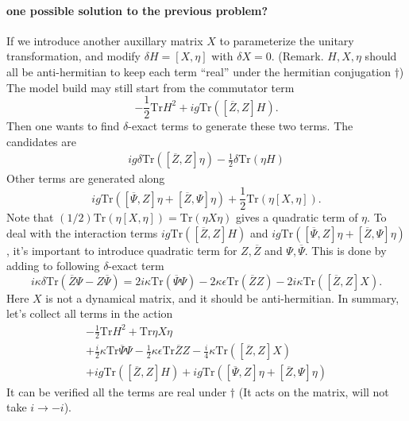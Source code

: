 \paragraph{one possible solution to the previous problem?}
If we introduce another auxillary matrix $X$ to parameterize the unitary transformation,
and modify $\delta H = [X,\eta]$ with $\delta X = 0$. (Remark. $H,X,\eta$ should all be anti-hermitian to keep each term ``real'' under the hermitian conjugation $\dagger$)
The model build may still start from the commutator term
\[
	- \frac{1}{2} \mathrm{Tr}H^2 + ig \mathrm{Tr}\left([\overline{Z},Z]H\right)
.\] 
Then one wants to find $\delta$-exact terms to generate these two terms.
The candidates are
\begin{align*}
	i g \delta \mathrm{Tr}\left([\overline{Z},Z]\eta\right) - \frac{1}{2} \delta \mathrm{Tr}\left(\eta H\right)
\end{align*}
Other terms are generated along
\[
	i g \mathrm{Tr}\left([\overline{\Psi},Z]\eta + [\overline{Z},\Psi]\eta\right) + \frac{1}{2} \mathrm{Tr}\left(\eta [X,\eta]\right)
.\] 
Note that $(1 / 2)\mathrm{Tr}(\eta [X, \eta]) = \mathrm{Tr} (\eta X \eta)$ gives a quadratic term of $\eta$.
To deal with the interaction terms $ig\mathrm{Tr}([\overline{Z},Z]H)$ and 
$ig \mathrm{Tr}([\overline{\Psi},Z]\eta + [\overline{Z},\Psi]\eta)$,
it's important to introduce quadratic term for $Z,\overline{Z}$ and $\Psi,\overline{\Psi}$.
This is done by adding to following $\delta$-exact term
\[
	i \kappa \delta \mathrm{Tr}\left(\overline{Z}\Psi - Z \overline{\Psi}\right) = 2i \kappa \mathrm{Tr}(\overline{\Psi}\Psi) - 2\kappa \epsilon \mathrm{Tr}(\overline{Z}Z) - 2i\kappa \mathrm{Tr}\left([\overline{Z},Z]X\right)
.\] 
Here $X$ is not a dynamical matrix, and it should be anti-hermitian.
In summary, let's collect all terms in the action
\begin{align*}
	- \frac{1}{2} \mathrm{Tr} H^2 + \mathrm{Tr} \eta X \eta \\
	+ \frac{i}{2} \kappa \mathrm{Tr} \overline{\Psi}\Psi - \frac{1}{2} \kappa \epsilon \mathrm{Tr} \overline{Z} Z - \frac{i}{4} \kappa \mathrm{Tr}\left([\overline{Z},Z]X\right) \\
	+ i g \mathrm{Tr} \left([\overline{Z},Z]H\right) + i g \mathrm{Tr}\left([\overline{\Psi},Z]\eta + [\overline{Z},\Psi]\eta\right)
\end{align*}
It can be verified all the terms are real under $\dagger$ (It acts on the matrix, will not take $i\to -i$).

